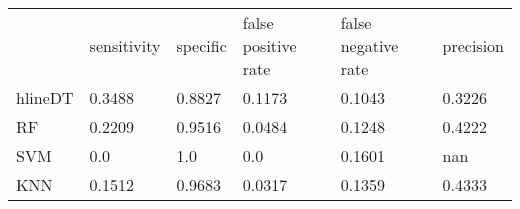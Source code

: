 \begin{table}[!h]
\begin{tabular}{l | l | l| l| l | l}
 & sensitivity & specific & false positive rate & false negative rate & precision \\hlineDT & 0.3488 & 0.8827 & 0.1173 & 0.1043 & 0.3226\\
RF & 0.2209 & 0.9516 & 0.0484 & 0.1248 & 0.4222\\
SVM & 0.0 & 1.0 & 0.0 & 0.1601 & nan\\
KNN & 0.1512 & 0.9683 & 0.0317 & 0.1359 & 0.4333\\
\end{tabular}
\caption{}
\end{table}
